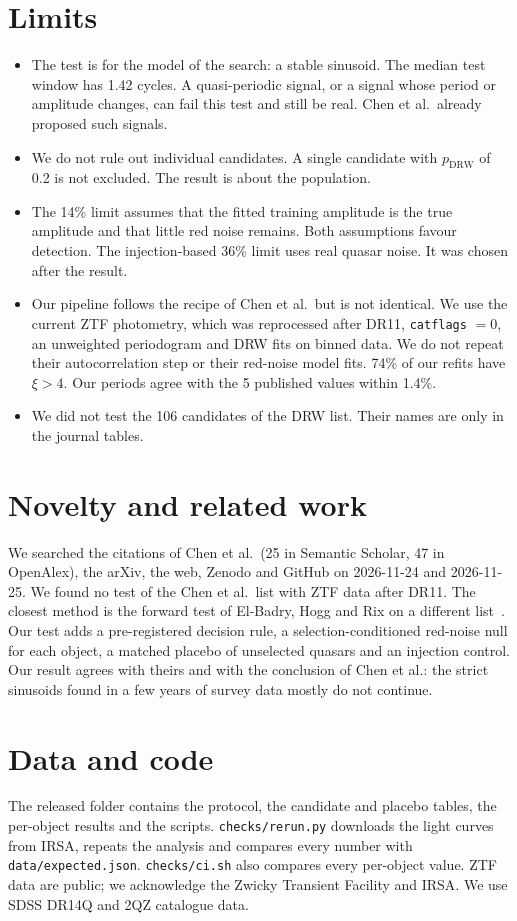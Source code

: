 \documentclass[11pt]{article}
\begin{document}
\section{Limits}
\begin{itemize}
\item The test is for the model of the search: a stable sinusoid. The median test window has 1.42 cycles. A quasi-periodic signal, or a signal whose period or amplitude changes, can fail this test and still be real. Chen et al.\ already proposed such signals.
\item We do not rule out individual candidates. A single candidate with $p_\text{DRW}$ of 0.2 is not excluded. The result is about the population.
\item The 14\% limit assumes that the fitted training amplitude is the true amplitude and that little red noise remains. Both assumptions favour detection. The injection-based 36\% limit uses real quasar noise. It was chosen after the result.
\item Our pipeline follows the recipe of Chen et al.\ but is not identical. We use the current ZTF photometry, which was reprocessed after DR11, \texttt{catflags} $=0$, an unweighted periodogram and DRW fits on binned data. We do not repeat their autocorrelation step or their red-noise model fits. 74\% of our refits have $\xi>4$. Our periods agree with the 5 published values within 1.4\%.
\item We did not test the 106 candidates of the DRW list. Their names are only in the journal tables.
\end{itemize}

\section{Novelty and related work}\label{sec:novelty}
We searched the citations of Chen et al.\ (25 in Semantic Scholar, 47 in OpenAlex), the arXiv, the web, Zenodo and GitHub on 2026-11-24 and 2026-11-25. We found no test of the Chen et al.\ list with ZTF data after DR11. The closest method is the forward test of El-Badry, Hogg and Rix on a different list~\cite{elbadry2025}. Our test adds a pre-registered decision rule, a selection-conditioned red-noise null for each object, a matched placebo of unselected quasars and an injection control. Our result agrees with theirs and with the conclusion of Chen et al.: the strict sinusoids found in a few years of survey data mostly do not continue.

\section{Data and code}
The released folder contains the protocol, the candidate and placebo tables, the per-object results and the scripts. \texttt{checks/rerun.py} downloads the light curves from IRSA, repeats the analysis and compares every number with \texttt{data/expected.json}. \texttt{checks/ci.sh} also compares every per-object value. ZTF data are public; we acknowledge the Zwicky Transient Facility and IRSA. We use SDSS DR14Q and 2QZ catalogue data.
\end{document}

